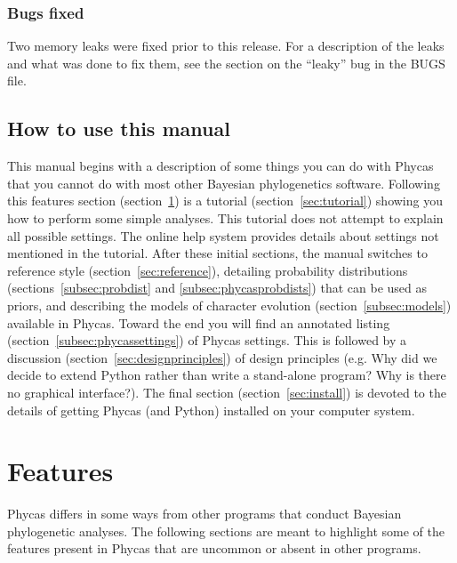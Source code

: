 \documentclass[10pt]{article}
\begin{document}
\subsubsection{Bugs fixed}
Two memory leaks were fixed prior to this release. For a description of the leaks and what was done to fix them, see the section on the ``leaky'' bug in the BUGS file.

\subsection{How to use this manual} %
This manual begins with a description of some things you can do with Phycas that you cannot do with most other Bayesian phylogenetics software. Following this features section (section~\ref{sec:features}) is a tutorial (section~\ref{sec:tutorial}) showing you how to perform some simple analyses. This tutorial does not attempt to explain all possible settings. The online help system provides details about settings not mentioned in the tutorial. After these initial sections, the manual switches to reference style (section~\ref{sec:reference}), detailing probability distributions (sections~\ref{subsec:probdist} and \ref{subsec:phycasprobdists}) that can be used as priors, and describing the models of character evolution (section~\ref{subsec:models}) available in Phycas. Toward the end you will find an annotated listing (section~\ref{subsec:phycassettings}) of Phycas settings. This is followed by a discussion (section~\ref{sec:designprinciples}) of design principles (e.g. Why did we decide to extend Python rather than write a stand-alone program? Why is there no graphical interface?). The final section (section~\ref{sec:install}) is devoted to the details of getting Phycas (and Python) installed on your computer system.

\section{Features}\label{sec:features}

Phycas differs in some ways from other programs that conduct Bayesian phylogenetic analyses. The following sections are meant to highlight some of the features present in Phycas that are uncommon or absent in other programs.
\end{document}
